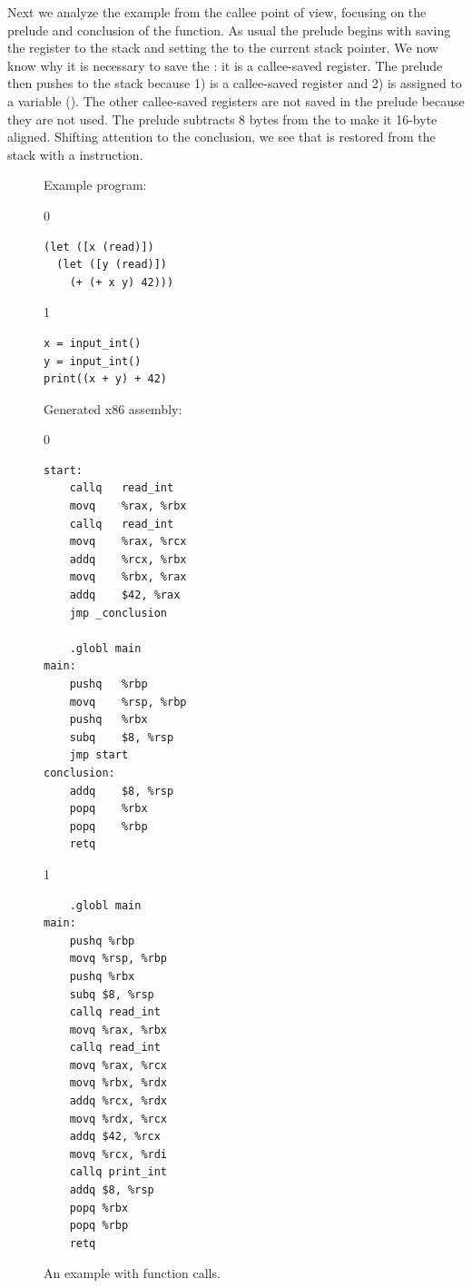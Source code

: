 \documentclass[7x10,nocrop]{TimesAPriori_MIT}%
\def\racketEd{0}
\def\pythonEd{1}
\def\edition{0}
\begin{document}
Next we analyze the example from the callee point of view, focusing on
the prelude and conclusion of the  function. As usual the
prelude begins with saving the  register to the stack and
setting the  to the current stack pointer. We now know why
it is necessary to save the : it is a callee-saved register.
The prelude then pushes  to the stack because 1) 
is a callee-saved register and 2)  is assigned to a variable
(). The other callee-saved registers are not saved in the
prelude because they are not used. The prelude subtracts 8 bytes from
the  to make it 16-byte aligned. Shifting attention to the
conclusion, we see that  is restored from the stack with a
 instruction.

\begin{figure}[tp]
\begin{minipage}{0.45\textwidth}
Example \LangVar{} program:
{\if\edition\racketEd
\begin{lstlisting}
(let ([x (read)])
  (let ([y (read)])
    (+ (+ x y) 42)))
\end{lstlisting}
\fi}
{\if\edition\pythonEd
\begin{lstlisting}
x = input_int()
y = input_int()
print((x + y) + 42)
\end{lstlisting}
\fi}
\end{minipage}
\begin{minipage}{0.45\textwidth}
Generated x86 assembly:
{\if\edition\racketEd
\begin{lstlisting}
start:
	callq	read_int
	movq	%rax, %rbx
	callq	read_int
	movq	%rax, %rcx
	addq	%rcx, %rbx
	movq	%rbx, %rax
	addq	$42, %rax
	jmp _conclusion

	.globl main
main:
	pushq	%rbp
	movq	%rsp, %rbp
	pushq	%rbx
	subq	$8, %rsp
	jmp start
conclusion:
	addq	$8, %rsp
	popq	%rbx
	popq	%rbp
	retq
\end{lstlisting}
\fi}
{\if\edition\pythonEd
\begin{lstlisting}
	.globl main
main:
	pushq %rbp
	movq %rsp, %rbp
	pushq %rbx
	subq $8, %rsp
	callq read_int
	movq %rax, %rbx
	callq read_int
	movq %rax, %rcx
	movq %rbx, %rdx
	addq %rcx, %rdx
	movq %rdx, %rcx
	addq $42, %rcx
	movq %rcx, %rdi
	callq print_int
	addq $8, %rsp
	popq %rbx
	popq %rbp
	retq
\end{lstlisting}
\fi}
\end{minipage}
\caption{An example with function calls.}
  \label{fig:example-calling-conventions}
\end{figure}
\end{document}
